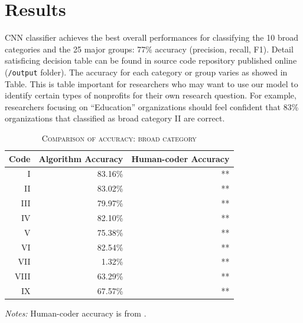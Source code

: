 \documentclass[11pt]{article}
\begin{document}
\section{Results}

CNN classifier achieves the best overall performances for classifying the 10 broad categories and the 25 major groups: 77\% accuracy (precision, recall, F1). Detail satisficing decision table can be found in source code repository published online (\texttt{/output} folder). The accuracy for each category or group varies as showed in Table. This is table important for researchers who may want to use our model to identify certain types of nonprofits for their own research question. For example, researchers focusing on ``Education'' organizations should feel confident that 83\% organizations that classified as broad category II are correct.

\begin{table}
\centering
\begin{threeparttable}
    \caption{\textsc{Comparison of accuracy: broad category}} \label{tab:acc_bc}
    \begin{tabular}{r|r|r}
		\hline
			Code & Algorithm Accuracy & Human-coder Accuracy \\
		\hline
			I & 83.16\% & ** \\
			II & 83.02\% & **  \\
			III & 79.97\% & **  \\
			IV & 82.10\% & **  \\
			V & 75.38\% & **  \\
			VI & 82.54\% & **  \\
			VII & 1.32\% & **  \\
			VIII & 63.29\% & **  \\
			IX & 67.57\% & ** \\
    	 \hline
    \end{tabular}
\begin{tablenotes}
\footnotesize
\item \emph{Notes:} Human-coder accuracy is from \textcite{StengelGettingItRight1998}.
\end{tablenotes}
\end{threeparttable}
\end{table}
\end{document}
